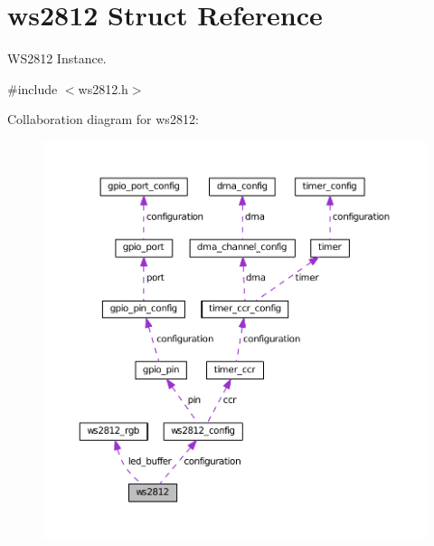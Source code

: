 \hypertarget{structws2812}{}\section{ws2812 Struct Reference}
\label{structws2812}


W\+S2812 Instance.  




{\ttfamily \#include $<$ws2812.\+h$>$}



Collaboration diagram for ws2812\+:\nopagebreak
\begin{figure}[H]
\begin{center}
\leavevmode
\includegraphics[width=350pt]{structws2812__coll__graph}
\end{center}
\end{figure}
